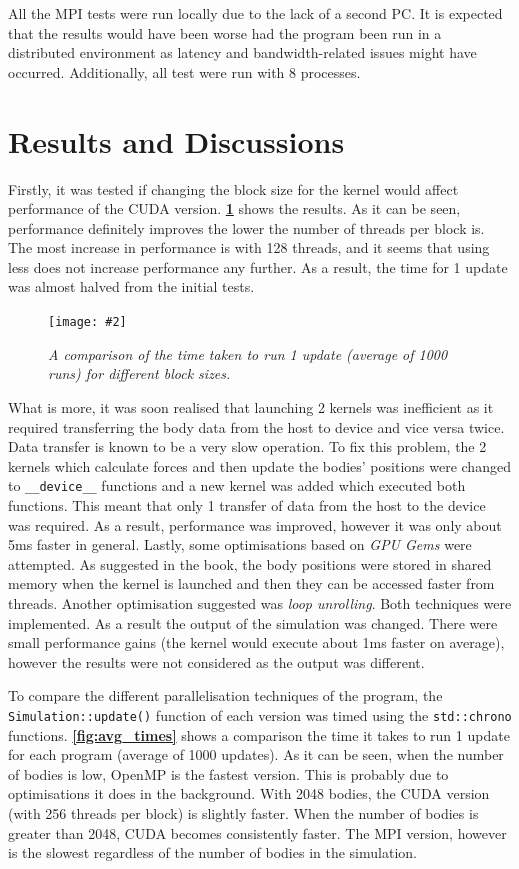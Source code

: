 \documentclass[12pt, a4paper]{article}
\newcommand{\figuremacro}[5]{
    \begin{figure}[#1]
        \centering
        \caption[#3]{\textbf{#3}#4}
        \texttt{[image: \#2]}
        \label{fig:#2}
    \end{figure}
}
\begin{document}
    All the MPI tests were run locally due to the lack of a second PC. It is expected that the results would have been worse had the program been run in a distributed environment as latency and bandwidth-related issues might have occurred. Additionally, all test were run with 8 processes.

    \section{Results and Discussions\label{sec:results}}
    Firstly, it was tested if changing the block size for the kernel would affect performance of the CUDA version. \textbf{\cref{fig:threads_cuda}} shows the results. As it can be seen, performance definitely improves the lower the number of threads per block is. The most increase in performance is with 128 threads, and it seems that using less does not increase performance any further. As a result, the time for 1 update was almost halved from the initial tests. 

    \figuremacro{h}{threads_cuda}{}{\small{\textit{A comparison of the time taken to run 1 update (average of 1000 runs) for different block sizes.}}}{1}

    What is more, it was soon realised that launching 2 kernels was inefficient as it required transferring the body data from the host to device and vice versa twice. Data transfer is known to be a very slow operation. To fix this problem, the 2 kernels which calculate forces and then update the bodies' positions were changed to \texttt{\_\_device\_\_} functions and a new kernel was added which executed both functions. This meant that only 1 transfer of data from the host to the device was required. As a result, performance was improved, however it was only about 5ms faster in general. Lastly, some optimisations based on \textit{GPU Gems} \cite{Nguyen:2007} were attempted. As suggested in the book, the body positions were stored in shared memory when the kernel is launched and then they can be accessed faster from threads. Another optimisation suggested was \textit{loop unrolling}. Both techniques were implemented. As a result the output of the simulation was changed. There were small performance gains (the kernel would execute about 1ms faster on average), however the results were not considered as the output was different.

    To compare the different parallelisation techniques of the program, the \texttt{Simulation::update()} function of each version was timed using the \texttt{std::chrono} functions. \textbf{\cref{fig:avg_times}} shows a comparison the time it takes to run 1 update for each program (average of 1000 updates). As it can be seen, when the number of bodies is low, OpenMP is the fastest version. This is probably due to optimisations it does in the background. With 2048 bodies, the CUDA version (with 256 threads per block) is slightly faster. When the number of bodies is greater than 2048, CUDA becomes consistently faster. The MPI version, however is the slowest regardless of the number of bodies in the simulation.
\end{document}
